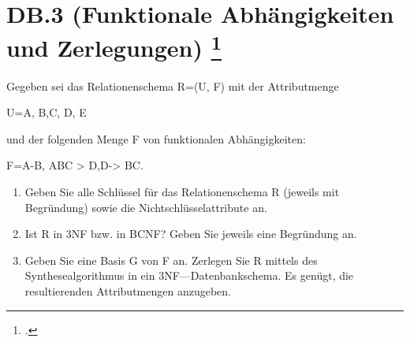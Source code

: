 \documentclass{lehramt-informatik-aufgabe}
\begin{document}
\section{DB.3 (Funktionale Abhängigkeiten und Zerlegungen)
\footcite{66116:2015:03}}

Gegeben sei das Relationenschema R=(U, F) mit der Attributmenge

U={A, B,C, D, E}

und der folgenden Menge F von funktionalen Abhängigkeiten:

F={A-B, ABC > D,D-> BC}.

\begin{enumerate}


\item Geben Sie alle Schlüssel für das Relationenschema R (jeweils mit
Begründung) sowie die Nichtschlüsselattribute an.


\item Ist R in 3NF bzw. in BCNF? Geben Sie jeweils eine Begründung an.


\item Geben Sie eine Basis G von F an. Zerlegen Sie R mittels des
Synthesealgorithmus in ein 3NF—Datenbankschema. Es genügt, die
resultierenden Attributmengen anzugeben.
\end{enumerate}
\end{document}
